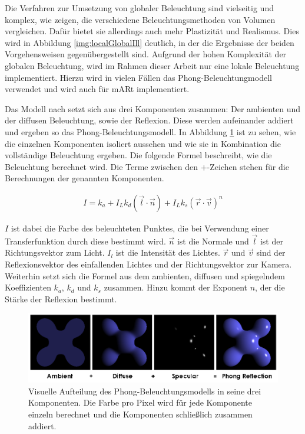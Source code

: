 Die Verfahren zur Umsetzung von globaler Beleuchtung sind vielseitig und komplex, wie \cite{Jnsson14} zeigen, die verschiedene Beleuchtungsmethoden von Volumen vergleichen. Dafür bietet sie allerdings auch mehr Plastizität und Realismus. Dies wird in Abbildung \ref{img:localGlobalIll} deutlich, in der die Ergebnisse der beiden Vorgehensweisen gegenübergestellt sind.
Aufgrund der hohen Komplexität der globalen Beleuchtung, wird im Rahmen dieser Arbeit nur eine lokale Beleuchtung implementiert. 
Hierzu wird in vielen Fällen das Phong-Beleuchtungmodell verwendet und wird auch für mARt implementiert.

Das Modell nach \cite{phong75} setzt sich aus drei Komponenten zusammen: Der ambienten und der diffusen Beleuchtung, sowie der Reflexion. Diese werden aufeinander addiert und ergeben so das Phong-Beleuchtungsmodell. In Abbildung \ref{img:phong} ist zu sehen, wie die einzelnen Komponenten isoliert aussehen und wie sie in Kombination die vollständige Beleuchtung ergeben.
Die folgende Formel beschreibt, wie die Beleuchtung berechnet wird. Die Terme zwischen den $+$-Zeichen stehen für die Berechnungen der genannten Komponenten.

\begin{align}
I = k_{a}+I_{L}k_{d}(\vec{l}\cdot\vec{n})+I_{L}k_{s}(\vec{r}\cdot\vec{v})^n
\end{align}


$I$ ist dabei die Farbe des beleuchteten Punktes, die bei Verwendung einer Transferfunktion durch diese bestimmt wird. $\vec{n}$ ist die Normale und $\vec{l}$ ist der Richtungsvektor zum Licht. $I_{l}$ ist die Intensität des Lichtes. $\vec{r}$ und $\vec{v}$ sind der Reflexionsvektor des einfallenden Lichtes und der Richtungsvektor zur Kamera. Weiterhin setzt sich die Formel aus dem ambienten, diffusen und spiegelndem Koeffizienten $k_{a}$, $k_{d}$ und $k_{s}$ zusammen. Hinzu kommt der Exponent $n$, der die Stärke der Reflexion bestimmt. 

\begin{figure}[!htb]
	\centering
	\includegraphics[width=0.7\linewidth]{images/Phong_components_version_4.png}
	\caption{Visuelle Aufteilung des Phong-Beleuchtungsmodells in seine drei Komponenten. Die Farbe pro Pixel wird für jede Komponente einzeln berechnet und die Komponenten schließlich zusammen addiert.}
	\label{img:phong}
\end{figure}
\FloatBarrier

